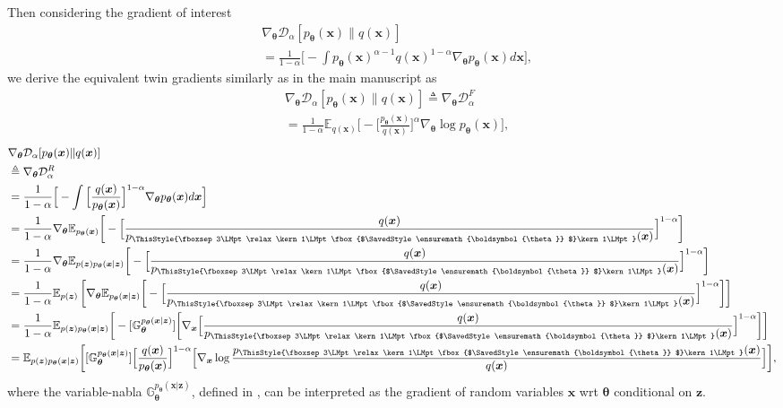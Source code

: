 \documentclass[letterpaper]{article} %
\newcommand{\Dc}[0]{\ensuremath{\mathcal{D}} }
\newcommand{\Ebb}[0]{\ensuremath{\mathbb{E}} }
\newcommand{\Gbb}[0]{\ensuremath{\mathbb{G}} }
\newcommand{\xv}[0]{\ensuremath{\boldsymbol{x}} }
\newcommand{\zv}[0]{\ensuremath{\boldsymbol{z}} }
\newcommand{\thetav}[0]{\ensuremath{\boldsymbol{\theta}} }
\newcommand\mathbox[1]{\mathord{\ThisStyle{%
			\fboxsep3\LMpt\relax\kern1\LMpt\fbox{$\SavedStyle#1$}\kern1\LMpt}}}
\begin{document}
Then considering the gradient of interest
\begin{equation}\label{eq:}
\begin{aligned}
    & \nabla_{\thetav} \Dc_{\alpha} [p_{\thetav}(\xv) \| q(\xv)]
    \\
    & 
    = \frac{1}{1 - \alpha} \Big[
    - \int p_{\thetav}(\xv)^{\alpha - 1} q(\xv)^{1-\alpha} \nabla_{\thetav} p_{\thetav}(\xv) d\xv \Big],
\end{aligned}
\end{equation}
we derive the equivalent twin gradients similarly as in the main manuscript as
\begin{equation}\label{eq:}
\begin{aligned}
    & \nabla_{\thetav} \Dc_{\alpha} [p_{\thetav}(\xv) \| q(\xv)]
    \triangleq \nabla_{\thetav} \Dc_{\alpha}^F
    \\
    & 
    = \frac{1}{1-\alpha} \Ebb_{q(\xv)} \bigg[
    -\Big[ \frac{p_{\thetav}(\xv)}{q(\xv)} \Big]^{\alpha}
    \nabla_{\thetav} \log p_{\thetav}(\xv)
    \bigg],
\end{aligned}
\end{equation}
\begin{equation}\label{eq:app_GO_grad_semi_implicit}
\begin{aligned}
    & \nabla_{\thetav} \Dc_{\alpha} [p_{\thetav}(\xv) \| q(\xv)]
    \\
    & \triangleq \nabla_{\thetav} \Dc_{\alpha}^R
    \\
    & 
    = \frac{1}{1 - \alpha} \Big[
    - \int \Big[ \frac{q(\xv)}{p_{\thetav}(\xv)} \Big]^{1-\alpha} \nabla_{\thetav} p_{\thetav}(\xv) d\xv \Big]
    \\
    & = \frac{1}{1 - \alpha} \nabla_{\thetav} 
    \Ebb_{p_{\thetav}(\xv)} \bigg[ -
    \Big[ \frac{q(\xv)}{p_{\mathbox{\thetav}}(\xv)} \Big]^{1-\alpha}
    \bigg]
    \\
    & = \frac{1}{1 - \alpha} \nabla_{\thetav} 
    \Ebb_{p(\zv) p_{\thetav}(\xv|\zv)} \bigg[ -
    \Big[ \frac{q(\xv)}{p_{\mathbox{\thetav}}(\xv)} \Big]^{1-\alpha}
    \bigg]
    \\
    & = \frac{1}{1 - \alpha} \Ebb_{p(\zv)} \left[ 
    \nabla_{\thetav} \Ebb_{p_{\thetav}(\xv|\zv)} 
    \bigg[ -
    \Big[ \frac{q(\xv)}{p_{\mathbox{\thetav}}(\xv)} \Big]^{1-\alpha}
    \bigg] \right]
    \\
    & = \frac{1}{1 - \alpha} \Ebb_{p(\zv) p_{\thetav}(\xv|\zv)} \bigg[ -
    [\Gbb^{p_{\thetav}(\xv|\zv)}_{\thetav}] 
    \bigg[ \nabla_{\xv} 
    \Big[ \frac{q(\xv)}{p_{\mathbox{\thetav}}(\xv)} \Big]^{1-\alpha}
    \bigg]
    \bigg]
    \\
    & = \Ebb_{p(\zv) p_{\thetav}(\xv|\zv)} \bigg[
    [\Gbb^{p_{\thetav}(\xv|\zv)}_{\thetav}] 
    \Big[\frac{q(\xv)}{p_{\thetav}(\xv)} \Big]^{1-\alpha}
    \Big[ \nabla_{\xv} \log \frac{p_{\mathbox{\thetav}}(\xv)}{q(\xv)} \Big]
    \bigg],
\end{aligned}
\end{equation}
where the variable-nabla $\Gbb^{p_{\thetav}(\xv|\zv)}_{\thetav}$, defined in \cite{cong2019go}, can be interpreted as the gradient of random variables $\xv$ wrt $\thetav$ conditional on $\zv$.
\end{document}
